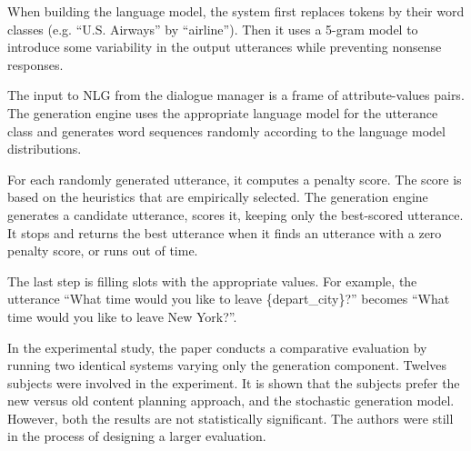 When building the language model, the system first replaces tokens by their word classes (e.g. ``U.S. Airways'' by ``airline''). Then it uses a 5-gram model to introduce some variability in the output utterances while preventing nonsense responses.

The input to NLG from the dialogue manager is a frame of attribute-values pairs. The generation engine uses the appropriate language model for the utterance class and generates word sequences randomly according to the language model distributions.

For each randomly generated utterance, it computes a penalty score. The score is based on the heuristics that are empirically selected. The generation engine generates a candidate utterance, scores it, keeping only the best-scored utterance. It stops and returns the best utterance when it finds an utterance with a zero penalty score, or runs out of time.

The last step is filling slots with the appropriate values. For example, the utterance ``What time would you like to leave \{depart\_city\}?'' becomes ``What time would you like to leave New York?''.

In the experimental study, the paper conducts a comparative evaluation by running two identical systems varying only the generation component. Twelves subjects were involved in the experiment. It is shown that the subjects prefer the new versus old content planning approach, and the stochastic generation model. However, both the results are not statistically significant. The authors were still in the process of designing a larger evaluation.
